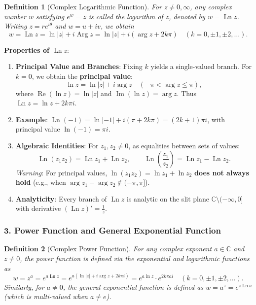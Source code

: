 \documentclass[11pt,a4paper]{article}
\theoremstyle{definitionbreak}
\newtheorem{definition}{Definition}
\theoremstyle{examplebreak}
\theoremstyle{plain}
\begin{document}
\begin{definition}[Complex Logarithmic Function]
For $z \neq 0, \infty$, any complex number $w$ satisfying $e^w = z$ is called the logarithm of $z$, denoted by $w = \operatorname{Ln} z$. Writing $z = r e^{i\theta}$ and $w = u + iv$, we obtain
\[
    w = \operatorname{Ln} z = \ln|z| + i\operatorname{Arg} z = \ln|z| + i(\arg z + 2k\pi) \quad (k = 0, \pm 1, \pm 2, \dots).
\]
\end{definition}

\textbf{Properties of $\operatorname{Ln} z$}:
\begin{enumerate}
    \item \textbf{Principal Value and Branches}: Fixing $k$ yields a single-valued branch. For $k = 0$, we obtain the \textbf{principal value}:
    \[
        \ln z = \ln|z| + i\arg z \quad (-\pi < \arg z \le \pi),
    \]
    where $\operatorname{Re}(\ln z) = \ln|z|$ and $\operatorname{Im}(\ln z) = \arg z$. Thus $\operatorname{Ln} z = \ln z + 2k\pi i$.
    \item \textbf{Example}: $\operatorname{Ln}(-1) = \ln|-1| + i(\pi + 2k\pi) = (2k + 1)\pi i$, with principal value $\ln(-1) = \pi i$.
    \item \textbf{Algebraic Identities}: For $z_1, z_2 \neq 0$, as equalities between sets of values:
    \[
        \operatorname{Ln}(z_1 z_2) = \operatorname{Ln} z_1 + \operatorname{Ln} z_2, \qquad \operatorname{Ln}\left(\frac{z_1}{z_2}\right) = \operatorname{Ln} z_1 - \operatorname{Ln} z_2.
    \]
    \emph{Warning}: For principal values, $\ln(z_1 z_2) = \ln z_1 + \ln z_2$ \textbf{does not always hold} (e.g., when $\arg z_1 + \arg z_2 \notin (-\pi, \pi]$).
    \item \textbf{Analyticity}: Every branch of $\operatorname{Ln} z$ is analytic on the slit plane $\mathbb{C} \setminus (-\infty, 0]$ with derivative $(\operatorname{Ln} z)' = \frac{1}{z}$.
\end{enumerate}

\subsubsection{3. Power Function and General Exponential Function}

\begin{definition}[Complex Power Function]
For any complex exponent $a \in \mathbb{C}$ and $z \neq 0$, the power function is defined via the exponential and logarithmic functions as
\[
    w = z^a = e^{a \operatorname{Ln} z} = e^{a(\ln|z| + i\arg z + 2k\pi i)} = e^{a \ln z} \cdot e^{2k\pi a i} \quad (k = 0, \pm 1, \pm 2, \dots).
\]
Similarly, for $a \neq 0$, the general exponential function is defined as $w = a^z = e^{z \operatorname{Ln} a}$ (which is multi-valued when $a \neq e$).
\end{definition}
\end{document}
